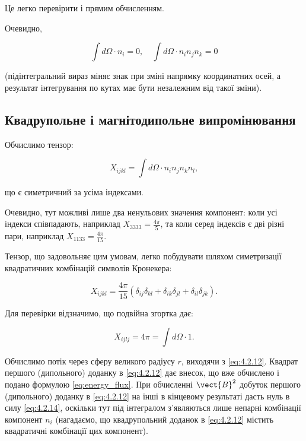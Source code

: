 Це легко перевірити і прямим обчисленням.

Очевидно,

\begin{equation}\label{eq:4.2.14}
\int d\Omega \cdot n_i = 0, \quad \int d\Omega \cdot n_i n_j n_k = 0
\end{equation}

(підінтегральний вираз міняє знак при зміні напрямку координатних осей, а результат інтегрування по кутах має бути незалежним від такої зміни).

\subsection*{Квадрупольне і магнітодипольне випромінювання}

Обчислимо тензор:

\begin{equation}
X_{ijkl} = \int d\Omega \cdot n_i n_j n_k n_l,
\label{eq:tensor_X}
\end{equation}

що є симетричний за усіма індексами.

Очевидно, тут можливі лише два ненульових значення компонент: коли усі індекси співпадають, наприклад \( X_{3333} = \frac{4\pi}{5} \), та коли серед
індексів є дві різні пари, наприклад \( X_{1133} = \frac{4\pi}{15} \).

Тензор, що задовольняє цим умовам, легко побудувати шляхом симетризації квадратичних комбінацій символів Кронекера:

\begin{equation}\label{eq:4.2.16}
X_{ijkl} = \frac{4\pi}{15} (\delta_{ij}\delta_{kl} + \delta_{ik}\delta_{jl} + \delta_{il}\delta_{jk}).
\end{equation}

Для перевірки відзначимо, що подвійна згортка дає:

\begin{equation*}
X_{ijlj} = 4\pi = \int d\Omega \cdot 1.
\end{equation*}

Обчислимо потік через сферу великого радіусу \( r \), виходячи з \eqref{eq:4.2.12}. Квадрат першого (дипольного) доданку в \eqref{eq:4.2.12} дає внесок,
що вже обчислено
і подано формулою \eqref{eq:energy_flux}. При обчисленні \( \vect{B}^2 \) добуток першого (дипольного) доданку в \eqref{eq:4.2.12} на інші в кінцевому
результаті
дасть нуль в
силу \eqref{eq:4.2.14}, оскільки тут під інтегралом з’являються лише непарні комбінації компонент \( n_i \) (нагадаємо, що квадрупольний доданок в
\eqref{eq:4.2.12}
містить квадратичні комбінації цих компонент).

